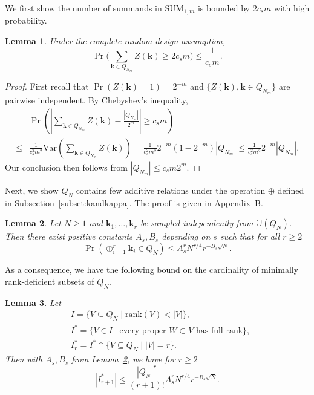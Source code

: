 \documentclass{article}
\newtheorem{lemma}{Lemma}
\theoremstyle{definition}
\renewcommand{\leq}{\leqslant}
\renewcommand{\geq}{\geqslant}
\newcommand{\bsk}{\boldsymbol{k}}
\newcommand{\dunif}{\mathbb{U}}
\newcommand{\var}{\mathrm{Var}}
\newcommand{\rank}{\mathrm{rank}}
\newcommand{\appB}{B}
\begin{document}
We first show the number of summands in $\mathrm{SUM}_{1,m}$ is bounded by $2c_sm$ with high probability.

\begin{lemma}\label{lem:SUM1bound}
Under the complete random design assumption,
    $$\Pr\Big(\sum_{\bsk\in Q_{N_m}}Z(\bsk)\geq 2c_sm\Big)\leq \frac{1}{c_s m}.$$
\end{lemma}
\begin{proof}
First recall that $\Pr(Z(\bsk)=1)=2^{-m}$ and $\{Z(\bsk),\bsk\in Q_{N_m}\}$ are pairwise independent. By Chebyshev's inequality,
    \begin{align*}
        & \Pr\left(\left|\sum_{\bsk\in Q_{N_m}}Z(\bsk)-\frac{|Q_{N_m}|}{2^m}\right|\geq c_s m\right) \\
        \leq  &\frac{1}{c^2_s m^2}\var\left(\sum_{\bsk\in Q_{N_m}}Z(\bsk)\right)
        =  \frac{1}{c^2_s m^2} 2^{-m}(1-2^{-m})|Q_{N_m}|
        \leq  \frac{1}{c^2_s m^2} 2^{-m}|Q_{N_m}|.
    \end{align*}
    Our conclusion then follows from $|Q_{N_m}|\leq c_s m 2^m$.
\end{proof}

Next, we show $Q_N$ contains few additive relations under the operation $\oplus$ defined in Subsection~\ref{subset:kandkappa}. The proof is given in Appendix~\appB.

\begin{lemma}\label{lem:sumk}
Let $N\geq 1$ and $\bsk_1,\dots,\bsk_r$ be sampled independently from $\dunif (Q_N)$. Then there exist positive constants $A_s, B_s$ depending on $s$ such that for all $r\geq 2$
\begin{equation*}
    \Pr\left(\oplus_{i=1}^r\bsk_i\in Q_N\right)\leq A^r_s N^{r/4} r^{-B_s\sqrt{N}}.
\end{equation*}
\end{lemma}

As a consequence, we have the following bound on the cardinality of minimally rank-deficient subsets of $Q_N$.

\begin{lemma}\label{lem:linearindep}
    Let
    \begin{align*}
        &I=\{V\subseteq Q_{N}\mid \rank(V)<|V| \},\\
        &I^*=\{V\in I\mid \text{every proper } W  \subset V \text{ has full rank}\},\\
        &I^*_{r}=I^*\cap \{V\subseteq Q_{N}\mid |V|=r\}.
    \end{align*}
Then with $A_s,B_s$ from Lemma~\ref{lem:sumk}, we have for $r\geq 2$
    $$|I^*_{r+1}|\leq \frac{|Q_{N}|^{r}}{(r+1)!}A^r_s N^{r/4} r^{-B_s\sqrt{N}}.$$
\end{lemma}
\end{document}
